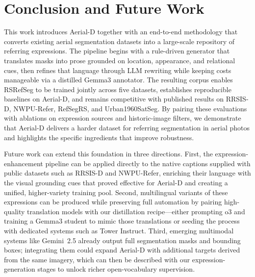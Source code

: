 
\section{Conclusion and Future Work}
\label{sec:conclusion}

This work introduces Aerial\mbox{-}D together with an end-to-end methodology that converts existing aerial segmentation datasets into a large-scale repository of referring expressions. The pipeline begins with a rule-driven generator that translates masks into prose grounded on location, appearance, and relational cues, then refines that language through LLM rewriting while keeping costs manageable via a distilled Gemma3 annotator. The resulting corpus enables RSRefSeg to be trained jointly across five datasets, establishes reproducible baselines on Aerial\mbox{-}D, and remains competitive with published results on RRSIS-D, NWPU-Refer, RefSegRS, and Urban1960SatSeg. By pairing these evaluations with ablations on expression sources and historic-image filters, we demonstrate that Aerial\mbox{-}D delivers a harder dataset for referring segmentation in aerial photos and highlights the specific ingredients that improve robustness.

Future work can extend this foundation in three directions. First, the expression-enhancement pipeline can be applied directly to the native captions supplied with public datasets such as RRSIS-D and NWPU-Refer, enriching their language with the visual grounding cues that proved effective for Aerial\mbox{-}D and creating a unified, higher-variety training pool. Second, multilingual variants of these expressions can be produced while preserving full automation by pairing high-quality translation models with our distillation recipe—either prompting o3 and training a Gemma3 student to mimic those translations or seeding the process with dedicated systems such as Tower Instruct. Third, emerging multimodal systems like Gemini 2.5\cite{gemini25} already output full segmentation masks and bounding boxes; integrating them could expand Aerial\mbox{-}D with additional targets derived from the same imagery, which can then be described with our expression-generation stages to unlock richer open-vocabulary supervision.
